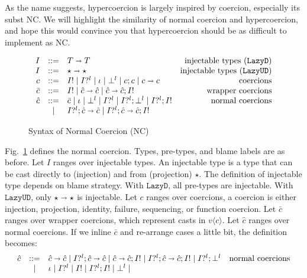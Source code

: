 \documentclass[acmsmall,review,anonymous]{acmart}\settopmatter{printfolios=true,printccs=false,printacmref=false}
\newcommand{\figref}[1]{Fig.~\ref{#1}}
\newcommand{\stxrule}[3]{#1 & ::= & #3 & \text{#2}\\}
\newcommand{\stxrulecont}[1]{& | & #1 & \\}
\newcommand{\plus}[0]{+}
\newcommand{\lazyUD}{$\mathtt{Lazy UD}$}
\newcommand{\lazyD}{$\mathtt{Lazy D}$}
\newcommand{\TOOdyn}[0]{\star}
\newcommand{\POOfun}[2]{#1 \shortrightarrow #2}
\newcommand{\POOprod}[2]{#1 \times #2}
\newcommand{\POOsum}[2]{#1 \plus #2}
\newcommand{\vOOcast}[2]{#1\langle#2\rangle}
\newcommand{\ncProj}[2]{#1?^{#2}}
\newcommand{\ncInj}[1]{#1!}
\newcommand{\ncId}[0]{\iota}
\newcommand{\ncSeq}[2]{#1;#2}
\newcommand{\ncFail}[1]{\bot^{#1}}
\newcommand{\ncFun}[2]{\POOfun{#1}{#2}}
\newcommand{\ncProd}[2]{\POOprod{#1}{#2}}
\newcommand{\ncSum}[2]{\POOsum{#1}{#2}}
\begin{document}
As the name suggests, 
hypercoercion is largely inspired by coercion, especially its subst NC.
We 
will highlight the similarity of normal coercion and hypercoercion, and hope 
this would convince you that hypercoercion should be as difficult to implement 
as NC.


\begin{figure}
	\[
	\begin{array}{rclr}
	\stxrule{I}{injectable types (\lazyD)}{
		\POOfun{T}{T}}
	\stxrule{I}{injectable types (\lazyUD)}{
		\POOfun{\TOOdyn}{\TOOdyn}
	}
	\stxrule{c}{coercions}{
		\ncInj{I} \mid
		\ncProj{I}{l} \mid
		\ncId \mid
		\ncFail{l} \mid
		\ncSeq{c}{c} \mid
		\ncFun{c}{c}
	}
	\stxrule{\bar{c}}{wrapper coercions}{	
		\ncInj{I} \mid
		\ncFun{\hat{c}}{\hat{c}} \mid
		\ncSeq{\ncFun{\hat{c}}{\hat{c}}}{\ncInj{I}}
	}
	\stxrule{\hat{c}}{normal coercions}{
		\bar{c} \mid
		\ncId \mid
		\ncFail{l} \mid
		\ncProj{I}{l} \mid
		\ncSeq{\ncProj{I}{l}}{\ncFail{l}} \mid
		\ncSeq{\ncProj{I}{l}}{\ncInj{I}}
	}
	\stxrulecont{
		\ncSeq{\ncProj{I}{l}}{\ncFun{\hat{c}}{\hat{c}}} \mid
		\ncSeq{\ncProj{I}{l}}{\ncSeq{\ncFun{\hat{c}}{\hat{c}}}{\ncInj{I}}}
	}
	\end{array}
	\]
	\caption{Syntax of Normal Coercion (NC)}
	\label{fig:normal-coercion}
\end{figure}

\figref{fig:normal-coercion} defines the normal coercion.
Types, pre-types, and blame labels are as before.
Let $ I $ ranges over injectable types. An injectable type is a type that can 
be cast directly to (injection) and from (projection) $ \TOOdyn $. The 
definition of injectable type depends on blame strategy. With \lazyD, all 
pre-types are injectable. With \lazyUD, only $ \POOfun{\TOOdyn}{\TOOdyn} $ 
is injectable. 
Let $ c $ ranges over coercions, a coercion is either injection, projection, 
identity, failure, sequencing, or function coercion.
Let $ \bar{c} $ ranges over wrapper coercions, which represent casts in $ 
\vOOcast{v}{c} $.
Let $ \hat{c} $ ranges over normal coercions. If we inline $ \bar{c} $ and 
re-arrange cases a little bit, the definition becomes:
\[
\begin{array}{rclr}
\stxrule{\hat{c}}{normal coercions}{
	\ncFun{\hat{c}}{\hat{c}} \mid
	\ncSeq{\ncProj{I}{l}}{\ncFun{\hat{c}}{\hat{c}}} \mid
	\ncSeq{\ncFun{\hat{c}}{\hat{c}}}{\ncInj{I}} \mid
	\ncSeq{\ncProj{I}{l}}{\ncSeq{\ncFun{\hat{c}}{\hat{c}}}{\ncInj{I}}} \mid
	\ncSeq{\ncProj{I}{l}}{\ncFail{l}}
}
\stxrulecont{
	\ncId \mid
	\ncProj{I}{l} \mid
	\ncInj{I} \mid
	\ncSeq{\ncProj{I}{l}}{\ncInj{I}} \mid
	\ncFail{l} \mid
}
\end{array}
\]
\end{document}
